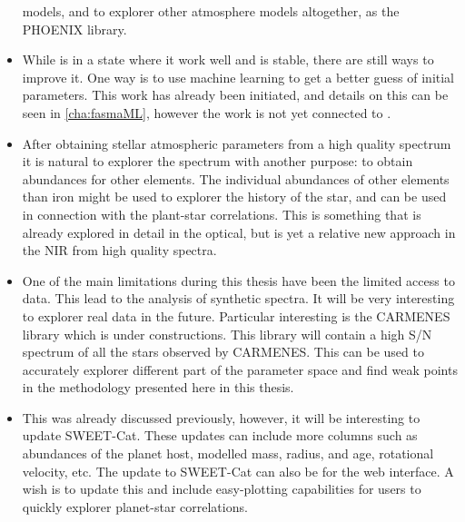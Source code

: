 \begin{itemize}
        models, and to explorer other atmosphere models altogether, as the PHOENIX library.
  \item While  is in a state where it work well and is stable, there are still ways to
        improve it. One way is to use machine learning to get a better guess of initial parameters.
        This work has already been initiated, and details on this can be seen in \cref{cha:fasmaML},
        however the work is not yet connected to .
  \item After obtaining stellar atmospheric parameters from a high quality spectrum it is natural to
        explorer the spectrum with another purpose: to obtain abundances for other elements. The
        individual abundances of other elements than iron might be used to explorer the history of
        the star, and can be used in connection with the plant-star correlations. This is something
        that is already explored in detail in the optical, but is yet a relative new approach in the
        NIR from high quality spectra.
  \item One of the main limitations during this thesis have been the limited access to data. This
        lead to the analysis of synthetic spectra. It will be very interesting to explorer real data
        in the future. Particular interesting is the CARMENES library which is under constructions.
        This library will contain a high S/N spectrum of all the stars observed by CARMENES. This
        can be used to accurately explorer different part of the parameter space and find weak
        points in the methodology presented here in this thesis.
  \item This was already discussed previously, however, it will be interesting to update SWEET-Cat.
        These updates can include more columns such as abundances of the planet host, modelled mass,
        radius, and age, rotational velocity, etc. The update to SWEET-Cat can also be for the web
        interface. A wish is to update this and include easy-plotting capabilities for users to
        quickly explorer planet-star correlations.
\end{itemize}
